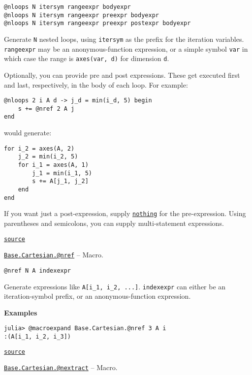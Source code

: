 \begin{adjustwidth}{2em}{0pt}


\begin{verbatim}
@nloops N itersym rangeexpr bodyexpr
@nloops N itersym rangeexpr preexpr bodyexpr
@nloops N itersym rangeexpr preexpr postexpr bodyexpr
\end{verbatim}

Generate \texttt{N} nested loops, using \texttt{itersym} as the prefix for the iteration variables. \texttt{rangeexpr} may be an anonymous-function expression, or a simple symbol \texttt{var} in which case the range is \texttt{axes(var, d)} for dimension \texttt{d}.

Optionally, you can provide {\textquotedbl}pre{\textquotedbl} and {\textquotedbl}post{\textquotedbl} expressions. These get executed first and last, respectively, in the body of each loop. For example:


\begin{lstlisting}
@nloops 2 i A d -> j_d = min(i_d, 5) begin
    s += @nref 2 A j
end
\end{lstlisting}

would generate:


\begin{lstlisting}
for i_2 = axes(A, 2)
    j_2 = min(i_2, 5)
    for i_1 = axes(A, 1)
        j_1 = min(i_1, 5)
        s += A[j_1, j_2]
    end
end
\end{lstlisting}

If you want just a post-expression, supply \hyperlink{9331422207248206047}{\texttt{nothing}} for the pre-expression. Using parentheses and semicolons, you can supply multi-statement expressions.



\href{https://github.com/JuliaLang/julia/blob/2d472c633d66e7697dda5aff75d2367b823048b8/base/cartesian.jl#L9-L37}{\texttt{source}}


\end{adjustwidth}
\hypertarget{5318613607184308860}{}
\hyperlink{5318613607184308860}{\texttt{Base.Cartesian.@nref}}  -- {Macro.}

\begin{adjustwidth}{2em}{0pt}


\begin{verbatim}
@nref N A indexexpr
\end{verbatim}

Generate expressions like \texttt{A[i\_1, i\_2, ...]}. \texttt{indexexpr} can either be an iteration-symbol prefix, or an anonymous-function expression.

\textbf{Examples}


\begin{verbatim}
julia> @macroexpand Base.Cartesian.@nref 3 A i
:(A[i_1, i_2, i_3])
\end{verbatim}



\href{https://github.com/JuliaLang/julia/blob/2d472c633d66e7697dda5aff75d2367b823048b8/base/cartesian.jl#L72-L83}{\texttt{source}}


\end{adjustwidth}
\hypertarget{5592996802344748158}{}
\hyperlink{5592996802344748158}{\texttt{Base.Cartesian.@nextract}}  -- {Macro.}

